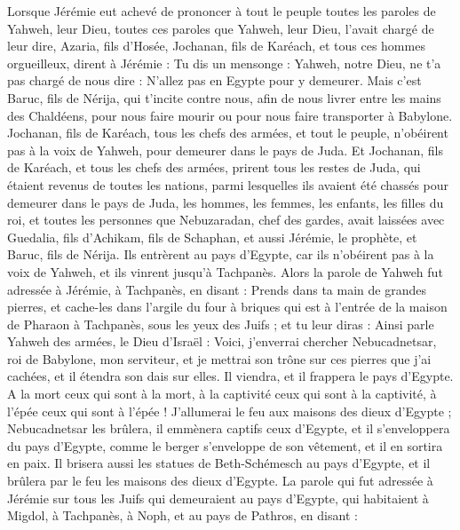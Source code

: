 \begin{multicols}{2}
\VerseOne{}Lorsque Jérémie eut achevé de prononcer à tout le peuple toutes les paroles de Yahweh, leur Dieu, toutes ces paroles que Yahweh, leur Dieu, l'avait chargé de leur dire,
Azaria, fils d'Hosée, Jochanan, fils de Karéach, et tous ces hommes orgueilleux, dirent à Jérémie : Tu dis un mensonge : Yahweh, notre Dieu, ne t'a pas chargé de nous dire : N'allez pas en Egypte pour y demeurer.
Mais c'est Baruc, fils de Nérija, qui t'incite contre nous, afin de nous livrer entre les mains des Chaldéens, pour nous faire mourir ou pour nous faire transporter à Babylone.
Jochanan, fils de Karéach, tous les chefs des armées, et tout le peuple, n'obéirent pas à la voix de Yahweh, pour demeurer dans le pays de Juda.
Et Jochanan, fils de Karéach, et tous les chefs des armées, prirent tous les restes de Juda, qui étaient revenus de toutes les nations, parmi lesquelles ils avaient été chassés pour demeurer dans le pays de Juda,
les hommes, les femmes, les enfants, les filles du roi, et toutes les personnes que Nebuzaradan, chef des gardes, avait laissées avec Guedalia, fils d'Achikam, fils de Schaphan, et aussi Jérémie, le prophète, et Baruc, fils de Nérija.
Ils entrèrent au pays d'Egypte, car ils n'obéirent pas à la voix de Yahweh, et ils vinrent jusqu'à Tachpanès.
Alors la parole de Yahweh fut adressée à Jérémie, à Tachpanès, en disant :
Prends dans ta main de grandes pierres, et cache-les dans l'argile du four à briques qui est à l'entrée de la maison de Pharaon à Tachpanès, sous les yeux des Juifs ;
et tu leur diras : Ainsi parle Yahweh des armées, le Dieu d'Israël : Voici, j'enverrai chercher Nebucadnetsar, roi de Babylone, mon serviteur, et je mettrai son trône sur ces pierres que j'ai cachées, et il étendra son dais sur elles.
Il viendra, et il frappera le pays d'Egypte. A la mort ceux qui sont à la mort, à la captivité ceux qui sont à la captivité, à l'épée ceux qui sont à l'épée !
J'allumerai le feu aux maisons des dieux d'Egypte ; Nebucadnetsar les brûlera, il emmènera captifs ceux d'Egypte, et il s'enveloppera du pays d'Egypte, comme le berger s'enveloppe de son vêtement, et il en sortira en paix.
Il brisera aussi les statues de Beth-Schémesch au pays d'Egypte, et il brûlera par le feu les maisons des dieux d'Egypte.
\VerseOne{}La parole qui fut adressée à Jérémie sur tous les Juifs qui demeuraient au pays d'Egypte, qui habitaient à Migdol, à Tachpanès, à Noph, et au pays de Pathros, en disant :

\end{multicols}
